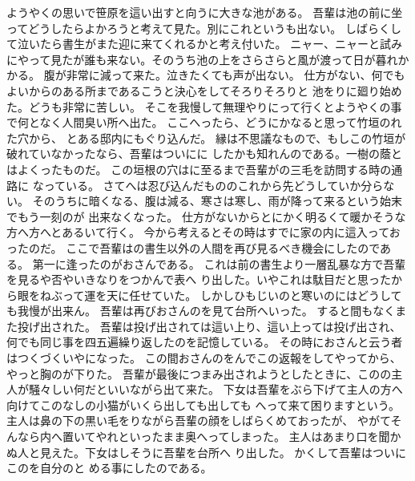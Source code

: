 \documentclass[lualatex,book,paper=b5,jafontsize=12pt]{jlreq}
\begin{document}
ようやくの思いで笹原を這い出すと向うに大きな池がある。
吾輩は池の前に坐ってどうしたらよかろうと考えて見た。別にこれというも出ない。
しばらくして泣いたら書生がまた迎に来てくれるかと考え付いた。
ニャー、ニャーと試みにやって見たが誰も来ない。そのうち池の上をさらさらと風が渡って日が暮れかかる。
腹が非常に減って来た。泣きたくても声が出ない。
仕方がない、何でもよいからのある所まであるこうと決心をしてそろりそろりと
池をりに廻り始めた。どうも非常に苦しい。
そこを我慢して無理やりにって行くとようやくの事で何となく人間臭い所へ出た。
ここへったら、どうにかなると思って竹垣のれた穴から、
とある邸内にもぐり込んだ。
縁は不思議なもので、もしこの竹垣が破れていなかったなら、吾輩はついにに
したかも知れんのである。一樹の蔭とはよくったものだ。
この垣根の穴はに至るまで吾輩がの三毛を訪問する時の通路に
なっている。
さてへは忍び込んだもののこれから先どうしていか分らない。
そのうちに暗くなる、腹は減る、寒さは寒し、雨が降って来るという始末でもう一刻のが
出来なくなった。
仕方がないからとにかく明るくて暖かそうな方へ方へとあるいて行く。
今から考えるとその時はすでに家の内に這入っておったのだ。
ここで吾輩はの書生以外の人間を再び見るべき機会にしたのである。
第一に逢ったのがおさんである。
これは前の書生より一層乱暴な方で吾輩を見るや否やいきなりをつかんで表へ
り出した。いやこれは駄目だと思ったから眼をねぶって運を天に任せていた。
しかしひもじいのと寒いのにはどうしても我慢が出来ん。
吾輩は再びおさんのを見て台所へいった。
すると間もなくまた投げ出された。
吾輩は投げ出されては這い上り、這い上っては投げ出され、何でも同じ事を四五遍繰り返したのを記憶している。
その時におさんと云う者はつくづくいやになった。
この間おさんのをんでこの返報をしてやってから、
やっと胸のが下りた。
吾輩が最後につまみ出されようとしたときに、このの主人が騒々しい何だといいながら出て来た。
下女は吾輩をぶら下げて主人の方へ向けてこのなしの小猫がいくら出しても出しても
へって来て困りますという。
主人は鼻の下の黒い毛をりながら吾輩の顔をしばらくめておったが、
やがてそんなら内へ置いてやれといったまま奥へってしまった。
主人はあまり口を聞かぬ人と見えた。下女はしそうに吾輩を台所へ
り出した。
かくして吾輩はついにこのを自分のと
める事にしたのである。
\end{document}
